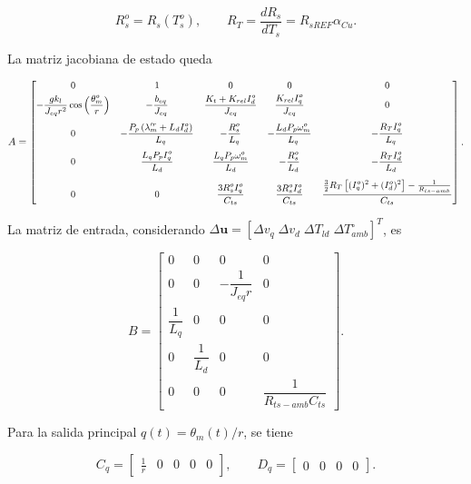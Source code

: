 \documentclass[10pt,a4paper]{article}
\begin{document}
\begin{equation}
    R_s^{o}=R_s(T_s^{o}),
    \qquad
    R_T=\frac{dR_s}{dT_s}=R_{sREF}\alpha_{Cu}.
    \label{eq:rs_rt_lpv}
\end{equation}

La matriz jacobiana de estado queda

\begin{equation}
\small
    A=
    \begin{bmatrix}
        0 & 1 & 0 & 0 & 0\\[1mm]
        -\dfrac{gk_l}{J_{eq}r^2}\cos\left(\dfrac{\theta_m^{o}}{r}\right)
        & -\dfrac{b_{eq}}{J_{eq}}
        & \dfrac{K_t+K_{rel}I_d^{o}}{J_{eq}}
        & \dfrac{K_{rel}I_q^{o}}{J_{eq}}
        & 0\\[4mm]
        0
        & -\dfrac{P_p\left(\lambda_m^{\prime r}+L_dI_d^{o}\right)}{L_q}
        & -\dfrac{R_s^{o}}{L_q}
        & -\dfrac{L_dP_p\omega_m^{o}}{L_q}
        & -\dfrac{R_T I_q^{o}}{L_q}\\[4mm]
        0
        & \dfrac{L_qP_pI_q^{o}}{L_d}
        & \dfrac{L_qP_p\omega_m^{o}}{L_d}
        & -\dfrac{R_s^{o}}{L_d}
        & -\dfrac{R_T I_d^{o}}{L_d}\\[4mm]
        0
        & 0
        & \dfrac{3R_s^{o}I_q^{o}}{C_{ts}}
        & \dfrac{3R_s^{o}I_d^{o}}{C_{ts}}
        & \dfrac{\frac{3}{2}R_T\left[(I_q^{o})^2+(I_d^{o})^2\right]-\frac{1}{R_{ts-amb}}}{C_{ts}}
    \end{bmatrix}.
    \label{eq:matriz_a_lpv}
\end{equation}

La matriz de entrada, considerando \(\Delta\mathbf{u}=[\Delta v_q\;\Delta v_d\;\Delta T_{ld}\;\Delta T_{amb}^{\circ}]^T\), es

\begin{equation}
    B=
    \begin{bmatrix}
        0 & 0 & 0 & 0\\[1mm]
        0 & 0 & -\dfrac{1}{J_{eq}r} & 0\\[4mm]
        \dfrac{1}{L_q} & 0 & 0 & 0\\[4mm]
        0 & \dfrac{1}{L_d} & 0 & 0\\[4mm]
        0 & 0 & 0 & \dfrac{1}{R_{ts-amb}C_{ts}}
    \end{bmatrix}.
    \label{eq:matriz_b_lpv}
\end{equation}

Para la salida principal \(q(t)=\theta_m(t)/r\), se tiene

\begin{equation}
    C_q=
    \begin{bmatrix}
        \frac{1}{r} & 0 & 0 & 0 & 0
    \end{bmatrix},
    \qquad
    D_q=
    \begin{bmatrix}
        0 & 0 & 0 & 0
    \end{bmatrix}.
    \label{eq:c_d_q_lpv}
\end{equation}
\end{document}

